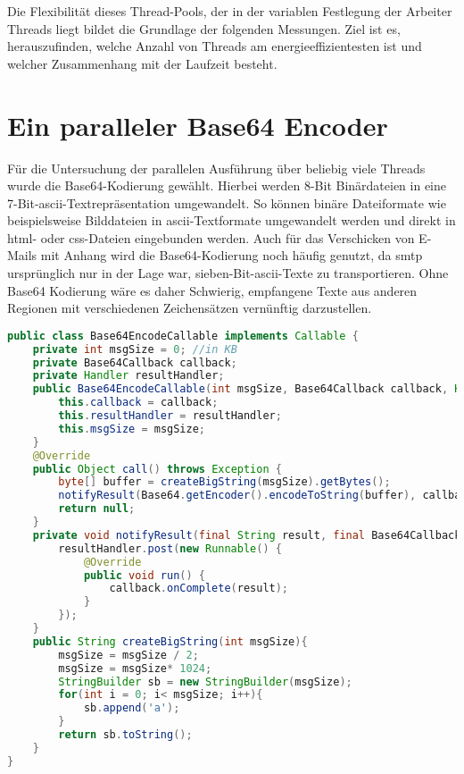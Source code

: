 Die Flexibilität dieses Thread-Pools, der in der variablen Festlegung der Arbeiter Threads liegt bildet die Grundlage der folgenden Messungen. Ziel ist es, herauszufinden, welche Anzahl von Threads am energieeffizientesten ist und welcher Zusammenhang mit der Laufzeit besteht.

\section{Ein paralleler Base64 Encoder}

Für die Untersuchung der parallelen Ausführung über beliebig viele Threads wurde die Base64-Kodierung gewählt. Hierbei werden 8-Bit Binärdateien in eine 7-Bit-\ac{ascii}-Textrepräsentation umgewandelt. So können binäre Dateiformate wie beispielsweise Bilddateien in \ac{ascii}-Textformate umgewandelt werden und direkt in \ac{html}- oder \ac{css}-Dateien eingebunden werden. Auch für das Verschicken von E-Mails mit Anhang wird die Base64-Kodierung noch häufig genutzt, da \ac{smtp} ursprünglich nur in der Lage war, sieben-Bit-\ac{ascii}-Texte zu transportieren. Ohne Base64 Kodierung wäre es daher Schwierig, empfangene Texte aus anderen Regionen mit verschiedenen Zeichensätzen vernünftig darzustellen.

\begin{lstlisting}[language=java,caption={Base64-Callable aus derEnergyEfficience App},label=lst:Base64Callable]
public class Base64EncodeCallable implements Callable {
    private int msgSize = 0; //in KB
    private Base64Callback callback;
    private Handler resultHandler;
    public Base64EncodeCallable(int msgSize, Base64Callback callback, Handler resultHandler){
        this.callback = callback;
        this.resultHandler = resultHandler;
        this.msgSize = msgSize;
    }
    @Override
    public Object call() throws Exception {
        byte[] buffer = createBigString(msgSize).getBytes();
        notifyResult(Base64.getEncoder().encodeToString(buffer), callback, resultHandler);
        return null;
    }
    private void notifyResult(final String result, final Base64Callback callback, final Handler resultHandler){
        resultHandler.post(new Runnable() {
            @Override
            public void run() {
                callback.onComplete(result);
            }
        });
    }
    public String createBigString(int msgSize){
        msgSize = msgSize / 2;
        msgSize = msgSize* 1024;
        StringBuilder sb = new StringBuilder(msgSize);
        for(int i = 0; i< msgSize; i++){
            sb.append('a');
        }
        return sb.toString();
    }
}
\end{lstlisting}

